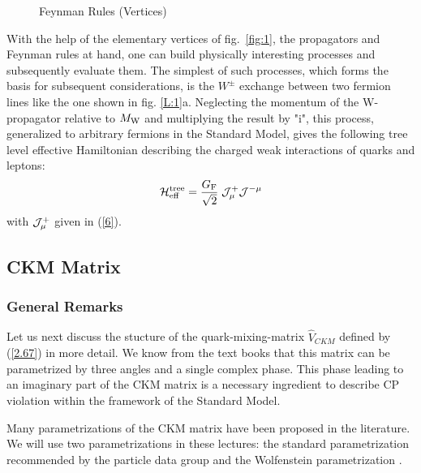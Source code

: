 \documentclass[12pt,rotate]{article}
\newcommand{\mw}{M_{\rm W}}
\begin{document}
\begin{itemize}
\begin{figure}[thb]
\centerline{
\epsfysize=9.5in
}
\vspace{-4.95in}
\caption[]{
Feynman Rules (Vertices)
\label{fig:3}}
\end{figure}

\noindent
With the help of the elementary vertices of fig.\ \ref{fig:1},
the propagators and  Feynman rules
at hand, one can build physically interesting
processes and subsequently evaluate them. The simplest of such
processes, which forms the basis for subsequent considerations, is the
$W^{\pm}$ exchange between two fermion lines like the one shown 
in fig. \ref{L:1}a.
Neglecting the momentum of the W-propagator relative to $\mw$ and
multiplying the result by "i",
this process, generalized to arbitrary fermions in the Standard Model,
 gives the following tree level effective Hamiltonian
describing the charged weak interactions of quarks and leptons:
\begin{equation}\label{WE}
{\cal H}^{\rm tree}_{\rm eff} = {{G_{\rm F}}\over{\sqrt2}}\;{\cal J}^+_\mu
{\cal J}^{-\mu}
\end{equation}
with ${\cal J}^+_\mu$  given in (\ref{6}).

\subsection{CKM Matrix}
\subsubsection{General Remarks}
Let us next discuss the stucture of the
quark-mixing-matrix $\hat V_{CKM}$ defined by (\ref{2.67}) in more
detail. We know from the text books that this matrix can be
parametrized by
three angles and a single complex phase.
This phase leading to an
imaginary part of the CKM matrix is a necessary ingredient to describe
CP violation within the framework of the Standard Model.

Many parametrizations of the CKM
matrix have been proposed in the literature.  We will use
two parametrizations in these lectures: the standard parametrization 
\cite{CHAU} recommended by the particle data group  \cite{PDG}  
and the Wolfenstein parametrization \cite{WO}.


\end{itemize}
\end{document}
